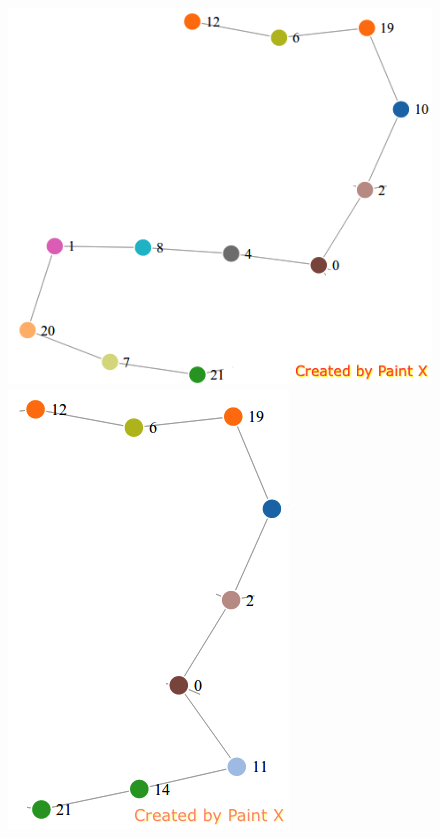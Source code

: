 \documentclass[11pt]{article}
\begin{document}
\begin{figure}
	{\includegraphics[scale=0.28]{./pics/paths/1.png}}
	{\includegraphics[scale=0.28]{./pics/paths/2.png}}

\end{figure}
\end{document}
